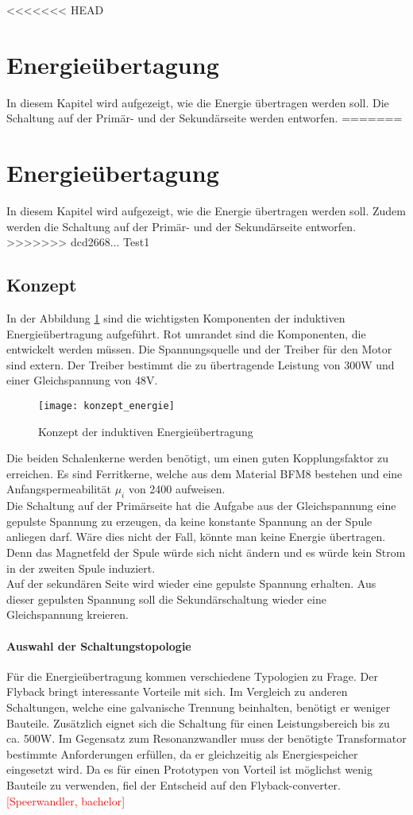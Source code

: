 <<<<<<< HEAD
\section{Energieübertagung}\label{sec:Energie}
In diesem Kapitel wird aufgezeigt, wie die Energie übertragen werden soll. Die Schaltung auf der Primär- und der Sekundärseite werden entworfen.
=======
\section{Energieübertagung}\label{sec:energie}
In diesem Kapitel wird aufgezeigt, wie die Energie übertragen werden soll. Zudem werden die Schaltung auf der Primär- und der Sekundärseite entworfen.
>>>>>>> dcd2668... Test1

\subsection{Konzept}
In der Abbildung \ref{fig:konzept_energie} sind die wichtigsten Komponenten der induktiven Energieübertragung aufgeführt. Rot umrandet sind die Komponenten, die entwickelt werden müssen. Die Spannungsquelle und der Treiber für den Motor sind extern. Der Treiber bestimmt die zu übertragende Leistung von 300W und einer Gleichspannung von 48V.

\begin{figure}[h]
	\centering
	\texttt{[image: konzept\_energie]}
	\caption{Konzept der induktiven Energieübertragung}\label{fig:konzept_energie}
\end{figure}

Die beiden Schalenkerne werden benötigt, um einen guten Kopplungsfaktor zu erreichen. Es sind Ferritkerne, welche aus dem Material BFM8 bestehen und eine Anfangspermeabilität $ \mu_{i} $ von 2400 aufweisen.\\ Die Schaltung auf der Primärseite hat die Aufgabe aus der Gleichspannung eine gepulste Spannung zu erzeugen, da keine konstante Spannung an der Spule anliegen darf. Wäre dies nicht der Fall, könnte man keine Energie übertragen. Denn das Magnetfeld der Spule würde sich nicht ändern und es würde kein Strom in der zweiten Spule induziert. \\
Auf der sekundären Seite wird wieder eine gepulste Spannung erhalten. Aus dieser gepulsten Spannung soll die Sekundärschaltung wieder eine Gleichspannung kreieren.

\paragraph{Auswahl der Schaltungstopologie}
Für die Energieübertragung kommen verschiedene Typologien zu Frage. Der Flyback bringt interessante Vorteile mit sich. Im Vergleich zu anderen Schaltungen, welche eine galvanische Trennung beinhalten, benötigt er weniger Bauteile. Zusätzlich eignet sich die Schaltung für einen Leistungsbereich bis zu ca. 500W. Im Gegensatz zum Resonanzwandler muss der benötigte Transformator bestimmte Anforderungen erfüllen, da er gleichzeitig als Energiespeicher eingesetzt wird. Da es für einen Prototypen von Vorteil ist möglichst wenig Bauteile zu verwenden, fiel der Entscheid auf den Flyback-converter.\textcolor{red}{[Speerwandler, bachelor]}

